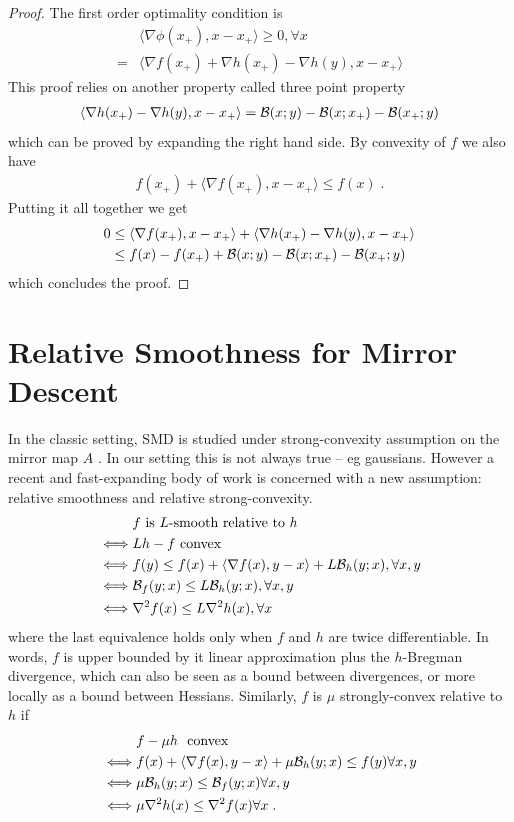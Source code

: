 \documentclass{article}
\newcommand{\logpart}{A}
\begin{document}
\begin{proof}
	The first order optimality condition is
	\begin{align}
		&\langle \nabla \phi (x_+) , x -  x_+ \rangle \geq 0, \forall x \\
		=& \langle \nabla f(x_+) + \nabla h(x_+) - \nabla h (y), x - x_+ \rangle  
	\end{align}
	This proof relies on another property called three point property 
	\begin{align}
		\langle \nabla h(x_+) - \nabla h (y), x - x_+ \rangle  ={\mathcal B}(x;y) -{\mathcal B}(x;x_+) - {\mathcal B}(x_+;y) 
	\end{align}
	which can be proved by expanding the right hand side.
	By convexity of $f$ we also have 
	\begin{align}
		 f(x_+) + \langle \nabla f(x_+), x - x_+ \rangle \leq f(x) \; .
	\end{align} 
	Putting it all together we get
	\begin{align}
		0 
		&\leq  \langle \nabla f(x_+), x - x_+ \rangle + \langle \nabla h(x_+) - \nabla h (y), x - x_+ \rangle  \\
		&\leq f(x) - f(x_+) + {\mathcal B}(x;y) -{\mathcal B}(x;x_+) - {\mathcal B}(x_+;y)
	\end{align}
	which concludes the proof.
\end{proof}


\section{Relative Smoothness for Mirror Descent}
In the classic setting, SMD is studied under strong-convexity assumption on the mirror map $\logpart$ \citep{bubeck2015convex}.
In our setting this is not always true -- eg gaussians.
However a recent and fast-expanding body of work is concerned with a new assumption: relative smoothness and relative strong-convexity.
\begin{align}
	& \text{$f$ is $L$-smooth relative to $h$} \\
	\iff & Lh - f \ \text{convex} \\
	\iff & f(y) \leq 	f(x) + \langle \nabla f(x) , y-x \rangle + L{\mathcal B}_h(y;x), \forall x,y \\
	\iff & {\mathcal B}_f(y;x) \leq L {\mathcal B}_h(y;x), \forall x,y \\
	\iff & \nabla^2 f(x) \leq L \nabla^2 h(x),  \forall x
\end{align} 
where the last equivalence holds only when $f$ and $h$ are twice differentiable. In words, $f$ is upper bounded by it linear approximation plus the $h$-Bregman divergence, which can also be seen as a bound between divergences, or more locally as a bound between Hessians. Similarly, $f$ is $\mu$ strongly-convex relative to $h$ if
\begin{align}
	& f-\mu h \ \text{ convex} \\
	\iff & f(x) + \langle \nabla f(x) , y-x \rangle + \mu {\mathcal B}_h(y;x) \leq f(y)\forall x,y \\
	\iff & \mu{\mathcal B}_h(y;x) \leq {\mathcal B}_f(y;x) \forall x,y \\
	\iff & \mu \nabla^2 h(x) \leq \nabla^2 f(x)  \forall x \; .
\end{align} 
\end{document}
